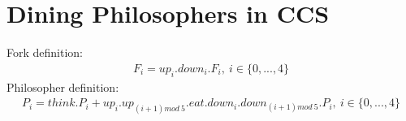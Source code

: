 \section{Dining Philosophers in CCS}
Fork definition:
\begin{align*}
F_i = up_i.down_i.F_i,~i\in\{0,...,4\}
\end{align*}
Philosopher definition:
\begin{align*}
P_i = think.P_i+up_i.up_{(i+1) mod~5}.eat.down_i.down_{(i+1) mod~5}.P_i,~i\in\{0,...,4\}
\end{align*}
